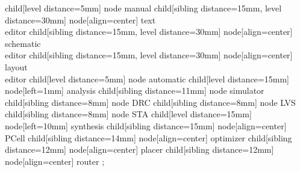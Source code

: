 \tikzset{level distance=15mm}

  child[level distance=5mm] {node {manual}
    child[sibling distance=15mm, level distance=30mm] 
      {node[align=center] {text\\editor}}
    child[sibling distance=15mm, level distance=30mm]
      {node[align=center] {schematic\\editor}}
    child[sibling distance=15mm, level distance=30mm]
      {node[align=center] {layout\\editor}}
  }
  child[level distance=5mm] {node {automatic}
    child[level distance=15mm] {node[left=1mm] {analysis}
      child[sibling distance=11mm] {node {simulator}}
      child[sibling distance=8mm] {node {DRC}}
      child[sibling distance=8mm] {node {LVS}}
      child[sibling distance=8mm] {node {STA}}
    }
    child[level distance=15mm] {node[left=10mm] {synthesis}
      child[sibling distance=15mm] {node[align=center] {PCell}}
      child[sibling distance=14mm] {node[align=center] {optimizer}}
      child[sibling distance=12mm] {node[align=center] {placer}}
      child[sibling distance=12mm] {node[align=center] {router}}
  }
};